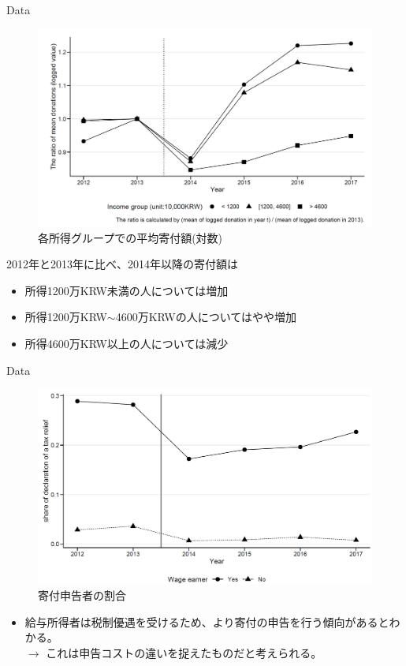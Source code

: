 \documentclass[dvipdfmx,10pt]{beamer}
\begin{document}
\begin{frame}{Data}
	\begin{figure}
		\centering
		\includegraphics[width=0.7\linewidth]{Fig_Diff}
		\caption{各所得グループでの平均寄付額(対数)}
		\label{fig:3}
	\end{figure}
\small
	2012年と2013年に比べ、2014年以降の寄付額は
	\begin{itemize}
		\item 所得1200万KRW未満の人については増加
		\item 所得1200万KRW$\sim$4600万KRWの人についてはやや増加
		\item 所得4600万KRW以上の人については減少
	\end{itemize}
\end{frame}

\begin{frame}{Data}
	\begin{figure}
		\centering
		\includegraphics[width=0.7\linewidth]{Fig_Declaration}
		\caption{寄付申告者の割合}
		\label{fig:4}
	\end{figure}
\small
	\begin{itemize}
		\item 給与所得者は税制優遇を受けるため、より寄付の申告を行う傾向があるとわかる。\\
		$\to$ これは申告コストの違いを捉えたものだと考えられる。
	\end{itemize}
\end{frame}
\end{document}
